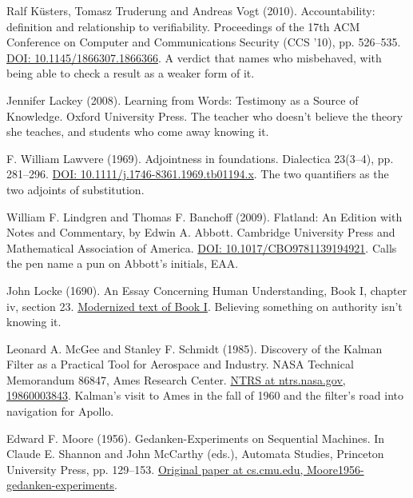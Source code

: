 \documentclass[11pt,twoside]{article}
\theoremstyle{thielethm}
\theoremstyle{thieledef}
\theoremstyle{thieledef}
\theoremstyle{thieledef}
\theoremstyle{thielethm}
\theoremstyle{thieleobs}
\theoremstyle{thielethm}
\begin{document}
\noindent Ralf K\"usters, Tomasz Truderung and Andreas Vogt (2010). Accountability: definition and relationship to verifiability. Proceedings of the 17th ACM Conference on Computer and Communications Security (CCS '10), pp. 526--535. \href{https://doi.org/10.1145/1866307.1866366}{DOI: 10.1145/1866307.1866366}. A verdict that names who misbehaved, with being able to check a result as a weaker form of it.
\par\medskip

\noindent Jennifer Lackey (2008). Learning from Words: Testimony as a Source of Knowledge. Oxford University Press. The teacher who doesn't believe the theory she teaches, and students who come away knowing it.
\par\medskip

\noindent F. William Lawvere (1969). Adjointness in foundations. Dialectica 23(3--4), pp. 281--296. \href{https://doi.org/10.1111/j.1746-8361.1969.tb01194.x}{DOI: 10.1111/j.1746-8361.1969.tb01194.x}. The two quantifiers as the two adjoints of substitution.
\par\medskip

\noindent William F. Lindgren and Thomas F. Banchoff (2009). Flatland: An Edition with Notes and Commentary, by Edwin A. Abbott. Cambridge University Press and Mathematical Association of America. \href{https://doi.org/10.1017/CBO9781139194921}{DOI: 10.1017/CBO9781139194921}. Calls the pen name a pun on Abbott's initials, EAA.
\par\medskip

\noindent John Locke (1690). An Essay Concerning Human Understanding, Book I, chapter iv, section 23. \href{https://www.earlymoderntexts.com/assets/pdfs/locke1690book1.pdf}{Modernized text of Book I}. Believing something on authority isn't knowing it.
\par\medskip

\noindent Leonard A. McGee and Stanley F. Schmidt (1985). Discovery of the Kalman Filter as a Practical Tool for Aerospace and Industry. NASA Technical Memorandum 86847, Ames Research Center. \href{https://ntrs.nasa.gov/citations/19860003843}{NTRS at ntrs.nasa.gov, 19860003843}. Kalman's visit to Ames in the fall of 1960 and the filter's road into navigation for Apollo.
\par\medskip

\noindent Edward F. Moore (1956). Gedanken-Experiments on Sequential Machines. In Claude E. Shannon and John McCarthy (eds.), Automata Studies, Princeton University Press, pp. 129--153. \href{https://www.cs.cmu.edu/~cdm/resources/Moore1956-gedanken-experiments.pdf}{Original paper at cs.cmu.edu, Moore1956-gedanken-experiments}.
\par\medskip
\end{document}
